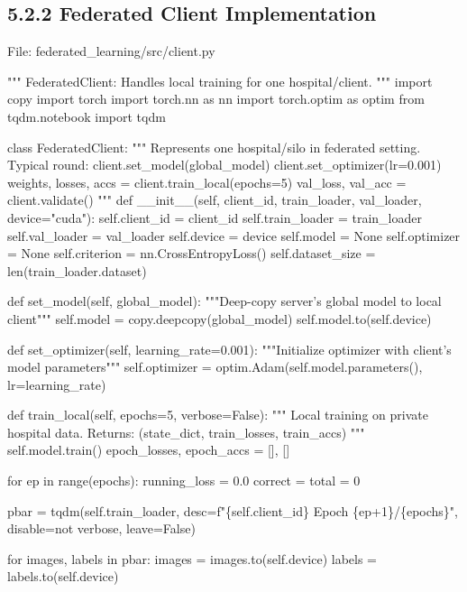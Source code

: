 \subsection{5.2.2 Federated Client Implementation}
File: federated\_learning/src/client.py

"""
FederatedClient: Handles local training for one hospital/client.
"""
import copy
import torch
import torch.nn as nn
import torch.optim as optim
from tqdm.notebook import tqdm

class FederatedClient:
    """
    Represents one hospital/silo in federated setting.
    Typical round:
        client.set\_model(global\_model)
        client.set\_optimizer(lr=0.001)
        weights, losses, accs = client.train\_local(epochs=5)
        val\_loss, val\_acc = client.validate()
    """
    def \_\_init\_\_(self, client\_id, train\_loader, val\_loader, device="cuda"):
        self.client\_id = client\_id
        self.train\_loader = train\_loader
        self.val\_loader = val\_loader
        self.device = device
        self.model = None
        self.optimizer = None
        self.criterion = nn.CrossEntropyLoss()
        self.dataset\_size = len(train\_loader.dataset)
    
    def set\_model(self, global\_model):
        """Deep-copy server's global model to local client"""
        self.model = copy.deepcopy(global\_model)
        self.model.to(self.device)
    
    def set\_optimizer(self, learning\_rate=0.001):
        """Initialize optimizer with client's model parameters"""
        self.optimizer = optim.Adam(self.model.parameters(), lr=learning\_rate)
    
    def train\_local(self, epochs=5, verbose=False):
        """
        Local training on private hospital data.
        Returns: (state\_dict, train\_losses, train\_accs)
        """
        self.model.train()
        epoch\_losses, epoch\_accs = [], []
        
        for ep in range(epochs):
            running\_loss = 0.0
            correct = total = 0
            
            pbar = tqdm(self.train\_loader, 
                       desc=f"\{self.client\_id\} Epoch \{ep+1\}/\{epochs\}",
                       disable=not verbose, leave=False)
            
            for images, labels in pbar:
                images = images.to(self.device)
                labels = labels.to(self.device)
                
